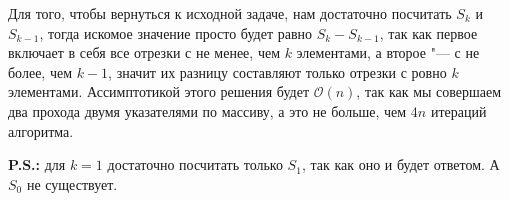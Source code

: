 	Для того, чтобы вернуться к исходной задаче, нам достаточно посчитать $S_k$ и $S_{k-1}$, тогда искомое значение просто будет равно $S_k - S_{k-1}$, так как первое включает в себя все отрезки с не менее, чем $k$ элементами, а второе "--- с не более, чем $k-1$, значит их разницу составляют только отрезки с ровно $k$ элементами. Ассимптотикой этого решения будет $\mathcal{O}(n)$, так как мы совершаем два прохода двумя указателями по массиву, а это не больше, чем $4n$ итераций алгоритма. 
	
	\textbf{P.S.:} для $k = 1$ достаточно посчитать только $S_1$, так как оно и будет ответом. А $S_0$ не существует.